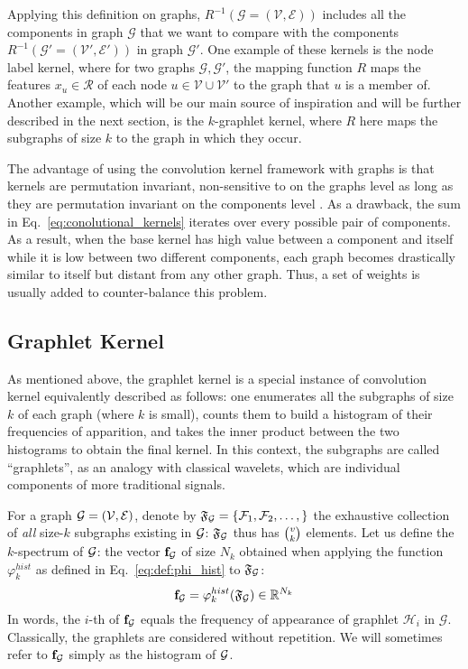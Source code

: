 Applying this definition on graphs, $R^{-1}(\mathcal{G}=(\mathcal{V},\mathcal{E}))$ includes all the components in graph $\mathcal{G}$  that we want to compare with the components $R^{-1}(\mathcal{G'}=(\mathcal{V}',\mathcal{E}'))$ in graph $\mathcal{G'}$. One example of these kernels is the node label kernel, where for two graphs $\mathcal{G}, \mathcal{G'}$, the mapping function $R$ maps the features $x_u\in \mathcal{R}$ of each node $u\in \mathcal{V}\cup \mathcal{V'}$ to the graph that $u$ is a member of.  Another example, which will be our main source of inspiration and will be further described in the next section, is the $k$-graphlet kernel, where $R$ here maps the subgraphs of size $k$ to the graph in which they occur.
 
The advantage of using the convolution kernel framework with graphs is that kernels are permutation invariant, non-sensitive to  on the graphs level as long as they are permutation invariant on the components level . As a drawback, the sum in Eq.~\ref{eq:conolutional_kernels} iterates over every possible pair of components. As a result, when the base kernel has high value between a component and itself while it is low between two different components, each graph becomes drastically similar to itself but distant from any other graph. Thus, a set of weights is usually added to counter-balance this problem.

\subsection{Graphlet Kernel}
\label{subsection: graphlet kernel}

As mentioned above, the graphlet kernel is a special instance of convolution kernel equivalently described as follows: one enumerates all the subgraphs of size $k$ of each graph (where $k$ is small), counts them to build a histogram of their frequencies of apparition, and takes the inner product between the two histograms to obtain the final kernel. In this context, the subgraphs are called ``graphlets'', as an analogy with classical wavelets, which are individual components of more traditional signals.

For a graph $\mathcal{G}=(\mathcal{V},\mathcal{E})$, denote by $\mathfrak{F}_{\mathcal{G}}=\{\mathcal{F}_1,\mathcal{F}_2,\ldots,\}$ the exhaustive collection of \emph{all} size-$k$ subgraphs existing in $\mathcal{G}$: $\mathfrak{F}_{\mathcal{G}}$ thus has $\tbinom{v}{k}$ elements. Let us define the $k$-spectrum of $\mathcal{G}$: the vector $\mathbf{f}_{\mathcal{G}}$ of size $N_k$ obtained when applying the function $\varphi_k^{hist}$ as defined in Eq.~\eqref{eq:def:phi_hist} to  $\mathfrak{F}_{\mathcal{G}}$:
\[
\mathbf{f}_{\mathcal{G}}=\varphi_k^{hist}(\mathfrak{F}_{\mathcal{G}}) \in\mathbb{R}^{N_k}
\]
In words, the $i$-th of $\mathbf{f}_{\mathcal{G}}$ equals the frequency of appearance of graphlet $\mathcal{H}_i$ in $\mathcal{G}$. Classically, the graphlets are considered without repetition. We will sometimes refer to $\mathbf{f}_{\mathcal{G}}$ simply as the histogram of $\mathcal{G}$. 

